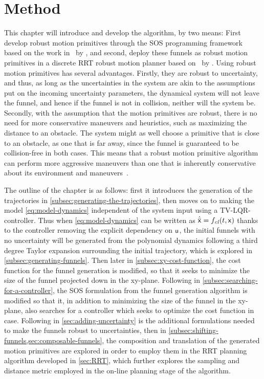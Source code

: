 \chapter{Method}
\label{chp:method}

This chapter will introduce and develop the \rrtfunnel{} algorithm, by two
means: First develop robust motion primitives through the \ac{SOS} programming
framework based on the work in~\cite{majumdarFunnelLibrariesRealtime2017} by
\citeauthor{majumdarFunnelLibrariesRealtime2017}, and second, deploy these
funnels as robust motion primitives in a discrete \ac{RRT} robust motion planner
based on~\cite{Lav06} by \citeauthor{Lav06}. Using robust motion primitives has
several advantages. Firstly, they are robust to uncertainty, and thus, as long
as the uncertainties in the system are akin to the assumptions put on the
incoming uncertainty parameters, the dynamical system will not leave the funnel,
and hence if the funnel is not in collision, neither will the system be.
Secondly, with the assumption that the motion primitives are robust, there is no
need for more conservative maneuvers and heuristics, such as maximizing the
distance to an obstacle. The system might as well choose a primitive that is
close to an obstacle, as one that is far away, since the funnel is guaranteed to
be collision-free in both cases. This means that a robust motion primitive
algorithm can perform more aggressive maneuvers than one that is inherently
conservative about its environment and
maneuvers~\cite{singhRobustOnlineMotion2017}.

The outline of the chapter is as follows: first it introduces the generation of
the trajectories in \cref{subsec:generating-the-trajectories}, then moves on to
making the model \cref{eq:model-dynamics} independent of the system input using
a \ac{TV-LQR}-controller. Thus when \eqref{eq:model-dynamics} can be written as
\( \dot{\bar{{\mathbf{\mathsf{x}}}}} = f_{\mathit{cl}}(t,{\mathbf{\mathsf{x}}}) \) thanks to the controller
removing the explicit dependency on \({\mathbf{\mathsf{u}}}\), the initial funnels with no
uncertainty will be generated from the polynomial dynamics following a third
degree Taylor expansion surrounding the initial trajectory, which is explored in
\cref{subsec:generating-funnels}. Then later in \cref{subsec:xy-cost-function},
the cost function for the funnel generation is modified, so that it seeks to
minimize the size of the funnel projected down in the xy-plane. Following in
\cref{subsec:searching-for-a-controller}, the \ac{SOS} formulation from the
funnel generation algorithm is modified so that it, in addition to minimizing
the size of the funnel in the xy-plane, also searches for a controller which
seeks to optimize the cost function in case. Following in
\cref{sec:adding-uncertainty} is the additional formulations needed to make the
funnels robust to uncertainties, then in
\cref{subsec:shifting-funnels,sec:composable-funnels}, the composition and
translation of the generated motion primitives are explored in order to employ
them in the \ac{RRT} planning algorithm developed in \cref{sec:RRT}, which
further explores the sampling and distance metric employed in the on-line
planning stage of the algorithm.

